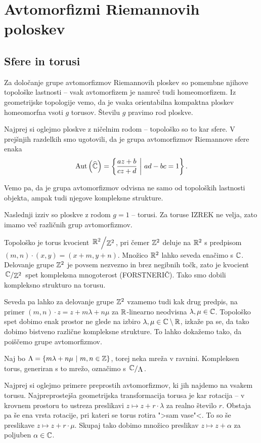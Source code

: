 \section{Avtomorfizmi Riemannovih poloskev}

\subsection{Sfere in torusi}

Za določanje grupe avtomorfizmov Riemannovih ploskev so pomembne
njihove topološke lastnosti -- vsak avtomorfizem je namreč tudi
homeomorfizem. Iz geometrijske topologije vemo, da je vsaka
orientabilna kompaktna ploskev homeomorfna vsoti $g$ torusov.
Številu $g$ pravimo rod ploskve.

Najprej si oglejmo ploskve z ničelnim rodom -- topološko so to kar
sfere. V prejšnjih razdelkih smo ugotovili, da je grupa
avtomorfizmov Riemannove sfere enaka
\[
\operatorname{Aut} \left(\widehat{\mathbb{C}}\right) = \left\{\frac{az + b}{cz + d}~\middle\vert~ad - bc = 1\right\}.
\]

Vemo pa, da je grupa avtomorfizmov odvisna ne samo od topoloških
lastnosti objekta, ampak tudi njegove kompleksne strukture.

Naslednji izziv so ploskve z rodom $g=1$ -- torusi. Za toruse
IZREK ne velja, zato imamo več različnih grup avtomorfizmov.

Topološko je torus kvocient $\kvoc{\R^2}{\Z^2}$, pri čemer $\mathbb{Z}^2$
deluje na $\mathbb{R}^2$ s predpisom $(m,n) \cdot (x,y) = (x+m, y+n)$.
Množico $\mathbb{R}^2$ lahko seveda enačimo s $\mathbb{C}$. Delovanje grupe $\mathbb{Z}^2$
je povsem nezvezno in brez negibnih točk, zato je kvocient
$\kvoc{\C}{\Z^2}$ spet kompleksna mnogoterost (FORSTNERIČ). Tako
smo dobili kompleksno strukturo na torusu.

Seveda pa lahko za delovanje grupe $\mathbb{Z}^2$ vzamemo tudi kak drug
predpis, na primer $(m,n) \cdot z = z + m \lambda+ n \mu$ za
$\mathbb{R}$-linearno neodvisna $\lambda, \mu \in \mathbb{C}$. Topološko spet
dobimo enak prostor ne glede na izbiro
$\lambda, \mu \in \mathbb{C} \setminus \mathbb{R}$, izkaže pa se, da tako dobimo
bistveno različne kompleksne strukture. To lahko dokažemo tako, da
poiščemo grupe avtomorfizmov.

Naj bo $\Lambda = \left\{m \lambda + n \mu~\middle\vert~m, n \in \mathbb{Z}\right\}$, torej
neka mreža v ravnini. Kompleksen torus, generiran s to mrežo,
označimo s $\kvoc{\C}{\Lambda}$.

Najprej si oglejmo primere preprostih avtomorfizmov, ki jih najdemo
na vsakem torusu. Najpreprostejša geometrijska transformacija
torusa je kar rotacija -- v krovnem prostoru to ustreza preslikavi
$z \mapsto z + r \cdot \lambda$ za realno število $r$. Obstaja pa
še ena vrsta rotacije, pri kateri se torus rotira ">sam vase"<.
To so še preslikave $z \mapsto z + r \cdot \mu$. Skupaj tako dobimo
množico preslikav $z \mapsto z + \alpha$ za poljuben
$\alpha \in \mathbb{C}$.

